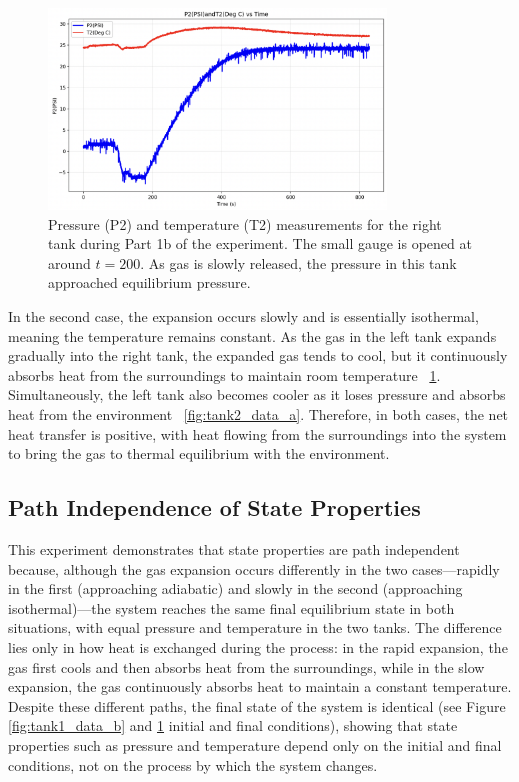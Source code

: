 \documentclass[12pt]{article}
\begin{document}
\begin{figure}[h!]
\centering
\includegraphics[width=0.8\textwidth]{1b-right_tank.png}
\caption{Pressure (P2) and temperature (T2) measurements for the right tank during Part 1b of the experiment. The small gauge is opened at around $t=200$. As gas is slowly released, the pressure in this tank approached equilibrium pressure.}
\label{fig:tank2_data_b}
\end{figure}

In the second case, the expansion occurs slowly and is essentially isothermal, meaning the temperature remains constant. As the gas in the left tank expands gradually into the right tank, the expanded gas tends to cool, but it continuously absorbs heat from the surroundings to maintain room temperature ~\ref{fig:tank2_data_b}. Simultaneously, the left tank also becomes cooler as it loses pressure and absorbs heat from the environment ~\ref{fig:tank2_data_a}. Therefore, in both cases, the net heat transfer is positive, with heat flowing from the surroundings into the system to bring the gas to thermal equilibrium with the environment.

\subsection*{Path Independence of State Properties}
This experiment demonstrates that state properties are path independent because, although the gas expansion occurs differently in the two cases—rapidly in the first (approaching adiabatic) and slowly in the second (approaching isothermal)—the system reaches the same final equilibrium state in both situations, with equal pressure and temperature in the two tanks. The difference lies only in how heat is exchanged during the process: in the rapid expansion, the gas first cools and then absorbs heat from the surroundings, while in the slow expansion, the gas continuously absorbs heat to maintain a constant temperature. Despite these different paths, the final state of the system is identical (see Figure \ref{fig:tank1_data_b} and \ref{fig:tank2_data_b} initial and final conditions), showing that state properties such as pressure and temperature depend only on the initial and final conditions, not on the process by which the system changes.
\end{document}
